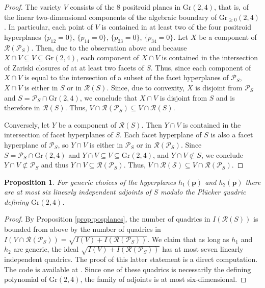 \documentclass[12pt]{extarticle}
\newtheorem{proposition}[theorem]{Proposition}
\theoremstyle{definition}
\begin{document}
\begin{proof}
    The variety $V$ consists of the $8$ positroid planes in $\mathrm{Gr}(2,4)$, that is, of the linear two-dimensional components of the algebraic boundary of $\mathrm{Gr}_{\geq 0}(2,4)$. In particular, each point of $V$ is contained in at least two of the four positroid hyperplanes $\{p_{12}=0\}$, $\{p_{14}=0\}$, $\{p_{23}=0\}$, $\{p_{34}=0\}$. Let $X$ be a component of $\mathcal{R}(\mathcal{P}_S)$. Then, due to the observation above and because $X\cap V \subseteq V \subseteq \mathrm{Gr}(2,4)$, each component of $X\cap V$ is contained in the intersection of Zariski closures of at at least two facets of $S$. Thus, since each component of $X\cap V$ is equal to the intersection of a subset of the facet hyperplanes of $\mathcal{P}_S$, $X\cap V$ is either in $S$ or in $\mathcal{R}(S)$. Since, due to convexity, $X$ is disjoint from $\mathcal{P}_S$ and $S = \mathcal{P}_S\cap \mathrm{Gr}(2,4)$, we conclude that $X\cap V$ is disjoint from $S$ and is therefore in $\mathcal{R}(S)$. Thus, $V \cap \mathcal{R}(\mathcal{P}_S)\subseteq V\cap\mathcal{R}(S)$.  

    Conversely, let $Y$ be a component of $\mathcal{R}(S)$. Then $Y\cap V$ is contained in the intersection of facet hyperplanes of $S$. Each facet hyperplane of $S$ is also a facet hyperplane of $\mathcal{P}_S$, so $Y\cap V$ is either in $\mathcal{P}_S$ or in $\mathcal{R}(\mathcal{P}_S)$. Since $S = \mathcal{P}_S\cap \mathrm{Gr}(2,4)$ and $Y\cap V \subseteq V \subseteq \mathrm{Gr}(2,4)$, and $Y\cap V \not \subset S$, we conclude $Y\cap V \not\subset \mathcal{P}_S$ and thus $Y\cap V \subseteq \mathcal{R}(\mathcal{P}_S)$. Thus, $V\cap\mathcal{R}(\mathcal{S})\subseteq V\cap \mathcal{R}(\mathcal{P}_S)$.
\end{proof}

\begin{proposition} \label{prop:sixquadrics}
    For generic choices of the hyperplanes $h_1(\mathbf{p})$ and $h_2(\mathbf{p})$ there are at most six linearly independent adjoints of $S$ modulo the Pl\"ucker quadric defining $\mathrm{Gr}(2,4)$.
\end{proposition}

\begin{proof}
    By Proposition \ref{prop:posplanes}, the number of quadrics in $I(\mathcal{R}(S))$ is bounded from above by the number of quadrics in $I(V \cap \mathcal{R}(\mathcal{P}_S)) = \sqrt{I(V)+I(\mathcal{R}(\mathcal{P}_S))}$. We claim that as long as $h_1$ and $h_2$ are generic, the ideal $\sqrt{I(V)+I(\mathcal{R}(\mathcal{P}_S))}$ has at most seven linearly independent quadrics. The proof of this latter statement is a direct computation. The code is available at \cite{mathrepo}. Since one of these quadrics is necessarily the defining polynomial of $\mathrm{Gr}(2,4)$, the family of adjoints is at most six-dimensional. 
\end{proof}
\end{document}
